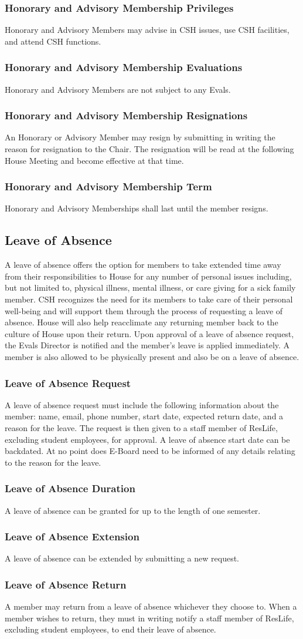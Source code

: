 \documentclass{article}
\newcommand{\asection}[1]{\subsection{#1} \label{#1}}
\newcommand{\asubsection}[1]{\subsubsection{#1} \label{#1}}
\begin{document}
\asubsection{Honorary and Advisory Membership Privileges}
Honorary and Advisory Members may advise in CSH issues, use CSH facilities, and attend CSH functions.

\asubsection{Honorary and Advisory Membership Evaluations}
Honorary and Advisory Members are not subject to any Evals.

\asubsection{Honorary and Advisory Membership Resignations}
An Honorary or Advisory Member may resign by submitting in writing the reason for resignation to the Chair.
The resignation will be read at the following House Meeting and become effective at that time.

\asubsection{Honorary and Advisory Membership Term}
Honorary and Advisory Memberships shall last until the member resigns.

\asection{Leave of Absence}
A leave of absence offers the option for members to take extended time away from their responsibilities to House for any number of personal issues including, but not limited to, physical illness, mental illness, or care giving for a sick family member.
CSH recognizes the need for its members to take care of their personal well-being and will support them through the process of requesting a leave of absence.
House will also help reacclimate any returning member back to the culture of House upon their return.
Upon approval of a leave of absence request, the Evals Director is notified and the member's leave is applied immediately.
A member is also allowed to be physically present and also be on a leave of absence.

\asubsection{Leave of Absence Request}
A leave of absence request must include the following information about the member: name, email, phone number, start date, expected return date, and a reason for the leave.
The request is then given to a staff member of ResLife, excluding student employees, for approval.
A leave of absence start date can be backdated.
At no point does E-Board need to be informed of any details relating to the reason for the leave.

\asubsection{Leave of Absence Duration}
A leave of absence can be granted for up to the length of one semester.

\asubsection{Leave of Absence Extension}
A leave of absence can be extended by submitting a new request.

\asubsection{Leave of Absence Return}
A member may return from a leave of absence whichever they choose to.
When a member wishes to return, they must in writing notify a staff member of ResLife, excluding student employees, to end their leave of absence.
\end{document}
